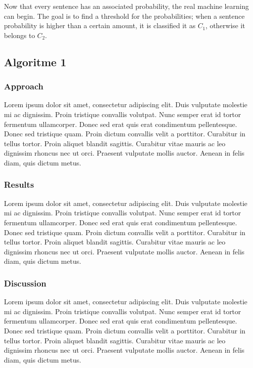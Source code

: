 \documentclass[11pt]{article}
\begin{document}
Now that every sentence has an associated probability, the real machine learning can begin. The goal is to find a threshold for the probabilities; when a sentence probability is higher than a certain amount, it is classified it as $C_1$,  otherwise it belongs to $C_2$.

\subsection{Algoritme 1}
\subsubsection{Approach}
Lorem ipsum dolor sit amet, consectetur adipiscing elit. Duis vulputate molestie mi ac dignissim. Proin tristique convallis volutpat. Nunc semper erat id tortor fermentum ullamcorper. Donec sed erat quis erat condimentum pellentesque. Donec sed tristique quam. Proin dictum convallis velit a porttitor. Curabitur in tellus tortor. Proin aliquet blandit sagittis. Curabitur vitae mauris ac leo dignissim rhoncus nec ut orci. Praesent vulputate mollis auctor. Aenean in felis diam, quis dictum metus.

\subsubsection{Results}
Lorem ipsum dolor sit amet, consectetur adipiscing elit. Duis vulputate molestie mi ac dignissim. Proin tristique convallis volutpat. Nunc semper erat id tortor fermentum ullamcorper. Donec sed erat quis erat condimentum pellentesque. Donec sed tristique quam. Proin dictum convallis velit a porttitor. Curabitur in tellus tortor. Proin aliquet blandit sagittis. Curabitur vitae mauris ac leo dignissim rhoncus nec ut orci. Praesent vulputate mollis auctor. Aenean in felis diam, quis dictum metus.

\subsubsection{Discussion}
Lorem ipsum dolor sit amet, consectetur adipiscing elit. Duis vulputate molestie mi ac dignissim. Proin tristique convallis volutpat. Nunc semper erat id tortor fermentum ullamcorper. Donec sed erat quis erat condimentum pellentesque. Donec sed tristique quam. Proin dictum convallis velit a porttitor. Curabitur in tellus tortor. Proin aliquet blandit sagittis. Curabitur vitae mauris ac leo dignissim rhoncus nec ut orci. Praesent vulputate mollis auctor. Aenean in felis diam, quis dictum metus.
\end{document}
